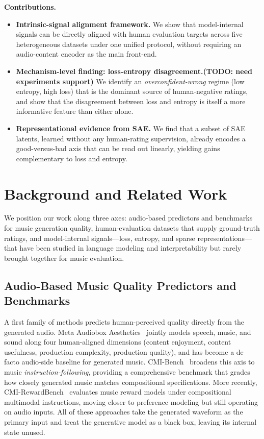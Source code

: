 \documentclass{article}
\begin{document}
\textbf{Contributions.}
\begin{itemize}
  \item \textbf{Intrinsic-signal alignment framework.}
    We show that model-internal signals can be directly aligned
    with human evaluation targets across five heterogeneous datasets
    under one unified protocol,
    without requiring an audio-content encoder as the main front-end.
  \item \textbf{Mechanism-level finding: loss-entropy disagreement.(TODO: need experiments support)}
    We identify an \emph{overconfident-wrong} regime
    (low entropy, high loss) that is the dominant source
    of human-negative ratings,
    and show that the disagreement between loss and entropy
    is itself a more informative feature than either alone.
  \item \textbf{Representational evidence from SAE.}
    We find that a subset of SAE latents,
    learned without any human-rating supervision,
    already encodes a good-versus-bad axis
    that can be read out linearly,
    yielding gains complementary to loss and entropy.
\end{itemize}

\section{Background and Related Work}\label{sec:background}

We position our work along three axes:
audio-based predictors and benchmarks for music generation quality,
human-evaluation datasets that supply ground-truth ratings,
and model-internal signals---loss, entropy, and sparse representations---%
that have been studied in language modeling and interpretability
but rarely brought together for music evaluation.

\subsection{Audio-Based Music Quality Predictors and Benchmarks}

A first family of methods predicts human-perceived quality
directly from the generated audio.
Meta Audiobox Aesthetics~\cite{tjandra2025audiobox}
jointly models speech, music, and sound
along four human-aligned dimensions
(content enjoyment, content usefulness,
production complexity, production quality),
and has become a de facto audio-side baseline for generated music.
CMI-Bench~\cite{ma2025cmibench} broadens this axis to
music \emph{instruction-following},
providing a comprehensive benchmark that grades
how closely generated music matches compositional specifications.
More recently, CMI-RewardBench~\cite{ma2026cmireward}
evaluates music reward models under compositional multimodal instructions,
moving closer to preference modeling but still operating on audio inputs.
All of these approaches take the generated waveform as the primary input
and treat the generative model as a black box,
leaving its internal state unused.
\end{document}
